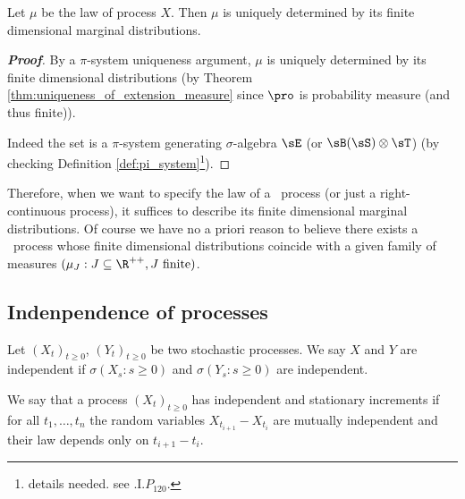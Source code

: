 \begin{proposition}\label{pro:process_law_is_uniquely_determined_by_its_finite_dimensional_marginal_distribution}
Let $\mu$ be the law of process $X$. Then $\mu$ is uniquely determined by its finite dimensional marginal distributions.
\end{proposition}

\begin{proof}[\bf Proof]
By a $\pi$-system uniqueness argument, $\mu$ is uniquely determined by its finite dimensional distributions (by Theorem \ref{thm:uniqueness_of_extension_measure} since $\pro$ is probability measure (and thus finite)).

Indeed the set
\be
{}
\ee
is a $\pi$-system generating $\sigma$-algebra $\sE$ (or $\sB(\sS)\otimes \sT$) (by checking Definition \ref{def:pi_system}\footnote{details needed. see \cite{Rogers_1994}.I.$P_{120}$.}).
\end{proof}

Therefore, when we want to specify the law of a \cadlag\ process (or just a right-continuous process), it suffices to describe its finite dimensional marginal distributions. Of course we have no a priori reason to believe there exists a \cadlag\ process whose finite dimensional distributions coincide with a given family of measures $(\mu_J : J \subseteq \R^{++}, J\text{ finite})$.

\subsection{Indenpendence of processes}

\begin{definition}\label{def:independence_stochastic_process}
Let $(X_t)_{t\geq 0}$, $(Y_t)_{t\geq 0}$ be two stochastic processes. We say $X$ and $Y$ are independent if $\sigma(X_s: s \geq 0)$ and $\sigma(Y_s: s \geq 0)$ are independent.
\end{definition}

\begin{definition}\label{def:independent_stationary_increments_stochastic_process}
We say that a process $(X_t)_{t \geq 0}$ has independent and stationary increments if for all $t_1,\dots, t_n$ the random variables $X_{t_{i+1}} -X_{t_i}$ are mutually independent and their law depends only on $t_{i+1} - t_i$.
\end{definition}


